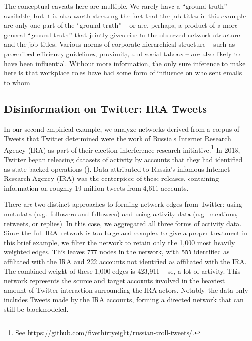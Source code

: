 \documentclass[
  12pt,
  a4paper,
  DIV=11,
  numbers=noendperiod,
  twoside,
  open=any]{scrartcl}
\begin{document}
The conceptual caveats here are multiple. We rarely have a ``ground
truth'' available, but it is also worth stressing the fact that the job
titles in this example are only one part of the ``ground truth'' -- or
are, perhaps, a product of a more general ``ground truth'' that jointly
gives rise to the observed network structure and the job titles. Various
norms of corporate hierarchical structure -- such as proscribed
efficiency guidelines, proximity, and social taboos -- are also likely
to have been influential. Without more information, the only sure
inference to make here is that workplace roles have had some form of
influence on who sent emails to whom.

\subsection{Disinformation on Twitter: IRA
Tweets}\label{disinformation-on-twitter-ira-tweets}

In our second empirical example, we analyze networks derived from a
corpus of Tweets that Twitter determined were the work of Russia's
Internet Research Agency (IRA) as part of their election interference
research initiative.\footnote{See
  \url{https://github.com/fivethirtyeight/russian-troll-tweets/}.} In
2018, Twitter began releasing datasets of activity by accounts that they
had identified as state-backed operations
(). Data attributed to Russia's
infamous Internet Research Agency (IRA) was the centerpiece of these
releases, containing information on roughly 10 million tweets from 4,611
accounts.

There are two distinct approaches to forming network edges from Twitter:
using metadata (e.g.~followers and followees) and using activity data
(e.g.~mentions, retweets, or replies). In this case, we aggregated all
three forms of activity data. Since the full IRA network is too large
and complex to give a proper treatment in this brief example, we filter
the network to retain only the 1,000 most heavily weighted edges. This
leaves 777 nodes in the network, with 555 identified as affiliated with
the IRA and 222 accounts not identified as affiliated with the IRA. The
combined weight of these 1,000 edges is 423,911 -- so, a lot of
activity. This network represents the source and target accounts
involved in the heaviest amount of Twitter interaction surrounding the
IRA actors. Notably, the data only includes Tweets made by the IRA
accounts, forming a directed network that can still be blockmodeled.
\end{document}

